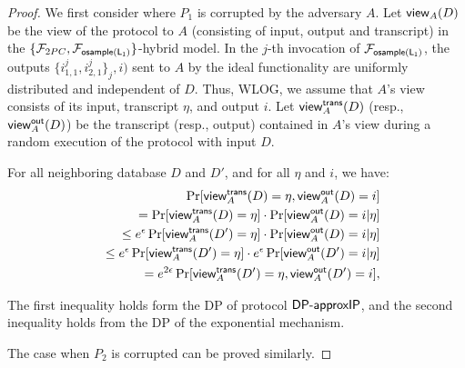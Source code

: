 \begin{proof}
We first consider where $P_1$ is corrupted by the adversary $A$. 
Let $\mathsf{view}_A(D)$ be the view of the protocol to $A$ (consisting of input, output and transcript)
in the $\{\mathcal{F}_{2PC}, \mathcal{F}_{\mathsf{osample(L_1)}} \}$-hybrid model.
In the $j$-th invocation of $\mathcal{F}_{\mathsf{osample(L_1)}}$,
the outputs $\{i_{1,1}^j,
i_{2,1}^j\}_j, i)$ sent to $A$ by the ideal functionality are uniformly
distributed and independent of $D$.
Thus, WLOG, we assume that 
$A$'s view consists of its input,
transcript $\eta$, and output $i$.
%
Let $\mathsf{view}^{\mathsf{trans}}_A(D)$ (resp., $\mathsf{view}^{\mathsf{out}}_A(D)$) be the transcript (resp., output)
contained in $A$'s view during a random execution of the protocol with input $D$.

For all neighboring database $D$ and $D'$, and for all $\eta$ and $i$, we have: 
\begin{eqnarray*}
&& \Pr[\mathsf{view}^{\mathsf{trans}}_A(D) = \eta, \mathsf{view}^{\mathsf{out}}_A(D) = i] \\
&& = \Pr[\mathsf{view}^{\mathsf{trans}}_A(D) = \eta] \cdot \Pr[\mathsf{view}^{\mathsf{out}}_A(D) = i | \eta]  \\
&& \le e^{\epsilon} \Pr[\mathsf{view}^{\mathsf{trans}}_A(D') = \eta] \cdot \Pr[\mathsf{view}^{\mathsf{out}}_A(D) = i | \eta] \\
&& \le e^{\epsilon} \Pr[\mathsf{view}^{\mathsf{trans}}_A(D') = \eta] \cdot e^{\epsilon} \Pr[\mathsf{view}^{\mathsf{out}}_A(D') = i | \eta] \\
&& = e^{2\epsilon} \Pr[\mathsf{view}^{\mathsf{trans}}_A(D') = \eta, \mathsf{view}^{\mathsf{out}}_A(D') = i],
\end{eqnarray*}

The first inequality holds form the DP of protocol $\mathsf{DP}\mbox{-}\mathsf{approxIP}$, and the
second inequality holds from the DP of the exponential mechanism.

The case when $P_2$ is corrupted can be proved similarly. 
\end{proof}








